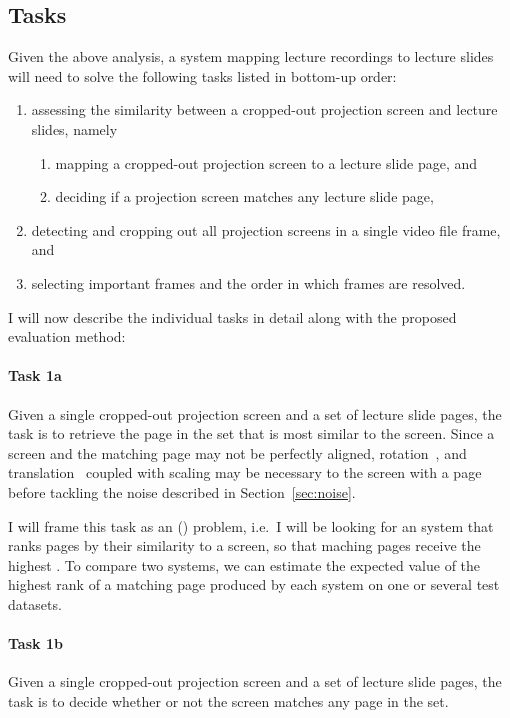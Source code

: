 \subsection{Tasks}
\label{sec:tasks}
Given the above analysis, a system mapping lecture recordings to lecture slides
will need to solve the following tasks listed in bottom-up order:
\begin{enumerate}
  \item assessing the similarity between a cropped-out projection screen and
    lecture slides, namely
    \begin{enumerate}
      \item mapping a cropped-out projection screen to a lecture slide page, and
      \item deciding if a projection screen matches any lecture slide page,
    \end{enumerate}
  \item detecting and cropping out all projection screens in a single video
    file frame, and
  \item selecting important frames and the order in which frames are resolved.
\end{enumerate}
I will now describe the individual tasks in detail along with the proposed
evaluation method:

\paragraph{Task 1a} Given a single cropped-out projection screen and a set of
lecture slide pages, the task is to retrieve the page in the set that is most
similar to the screen. Since a screen and the matching page may not be
perfectly aligned, rotation~\cite{smith1995simple}, and
translation~\cite{sarvaiyaetal09} coupled with scaling may be necessary to
 the screen with a page before tackling the noise described in
Section~\ref{sec:noise}.

I will frame this task as an  () problem,
i.e.\ I will be looking for an  system that ranks pages by their
similarity to a screen, so that maching pages receive the highest .
To compare two systems, we can estimate the expected value of the highest
rank of a matching page produced by each system on one or several test
datasets.

\paragraph{Task 1b} Given a single cropped-out projection screen and a set of
lecture slide pages, the task is to decide whether or not the screen matches
any page in the set.

